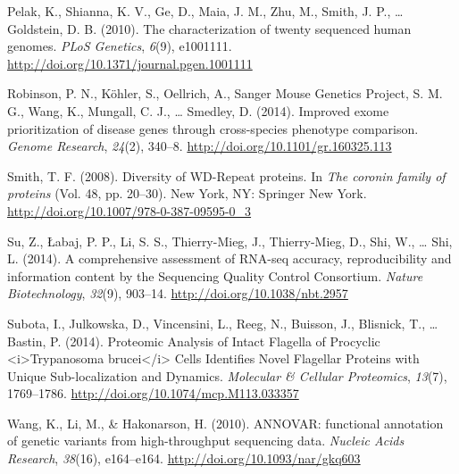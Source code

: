 \documentclass[12pt,twoside]{reedthesis}
\theoremstyle{definition}
\theoremstyle{definition}
\theoremstyle{remark}
\begin{document}
  \hypertarget{ref-Pelak2010}{}
  Pelak, K., Shianna, K. V., Ge, D., Maia, J. M., Zhu, M., Smith, J. P.,
  \ldots{} Goldstein, D. B. (2010). The characterization of twenty
  sequenced human genomes. \emph{PLoS Genetics}, \emph{6}(9), e1001111.
  \url{http://doi.org/10.1371/journal.pgen.1001111}
  
  \hypertarget{ref-Robinson2014}{}
  Robinson, P. N., Köhler, S., Oellrich, A., Sanger Mouse Genetics
  Project, S. M. G., Wang, K., Mungall, C. J., \ldots{} Smedley, D.
  (2014). Improved exome prioritization of disease genes through
  cross-species phenotype comparison. \emph{Genome Research},
  \emph{24}(2), 340--8. \url{http://doi.org/10.1101/gr.160325.113}
  
  \hypertarget{ref-Smith2008}{}
  Smith, T. F. (2008). Diversity of WD-Repeat proteins. In \emph{The
  coronin family of proteins} (Vol. 48, pp. 20--30). New York, NY:
  Springer New York. \url{http://doi.org/10.1007/978-0-387-09595-0_3}
  
  \hypertarget{ref-Su2014}{}
  Su, Z., Łabaj, P. P., Li, S. S., Thierry-Mieg, J., Thierry-Mieg, D.,
  Shi, W., \ldots{} Shi, L. (2014). A comprehensive assessment of RNA-seq
  accuracy, reproducibility and information content by the Sequencing
  Quality Control Consortium. \emph{Nature Biotechnology}, \emph{32}(9),
  903--14. \url{http://doi.org/10.1038/nbt.2957}
  
  \hypertarget{ref-Subota2014}{}
  Subota, I., Julkowska, D., Vincensini, L., Reeg, N., Buisson, J.,
  Blisnick, T., \ldots{} Bastin, P. (2014). Proteomic Analysis of Intact
  Flagella of Procyclic \textless{}i\textgreater{}Trypanosoma
  brucei\textless{}/i\textgreater{} Cells Identifies Novel Flagellar
  Proteins with Unique Sub-localization and Dynamics. \emph{Molecular \&
  Cellular Proteomics}, \emph{13}(7), 1769--1786.
  \url{http://doi.org/10.1074/mcp.M113.033357}
  
  \hypertarget{ref-Wang2010}{}
  Wang, K., Li, M., \& Hakonarson, H. (2010). ANNOVAR: functional
  annotation of genetic variants from high-throughput sequencing data.
  \emph{Nucleic Acids Research}, \emph{38}(16), e164--e164.
  \url{http://doi.org/10.1093/nar/gkq603}


\end{document}
